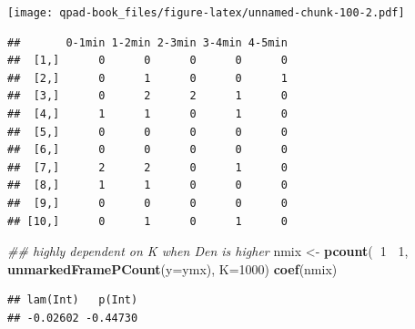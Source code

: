 \documentclass[12pt,]{book}
\newenvironment{Shaded}{\begin{snugshade}}{\end{snugshade}}
\newcommand{\CommentTok}[1]{\textcolor[rgb]{0.56,0.35,0.01}{\textit{#1}}}
\newcommand{\ControlFlowTok}[1]{\textcolor[rgb]{0.13,0.29,0.53}{\textbf{#1}}}
\newcommand{\DataTypeTok}[1]{\textcolor[rgb]{0.13,0.29,0.53}{#1}}
\newcommand{\DecValTok}[1]{\textcolor[rgb]{0.00,0.00,0.81}{#1}}
\newcommand{\FloatTok}[1]{\textcolor[rgb]{0.00,0.00,0.81}{#1}}
\newcommand{\KeywordTok}[1]{\textcolor[rgb]{0.13,0.29,0.53}{\textbf{#1}}}
\newcommand{\NormalTok}[1]{#1}
\newcommand{\OperatorTok}[1]{\textcolor[rgb]{0.81,0.36,0.00}{\textbf{#1}}}
\newcommand{\StringTok}[1]{\textcolor[rgb]{0.31,0.60,0.02}{#1}}
\begin{document}
\texttt{[image: qpad-book\_files/figure-latex/unnamed-chunk-100-2.pdf]}

\begin{Shaded}
\end{Shaded}

\begin{verbatim}
##       0-1min 1-2min 2-3min 3-4min 4-5min
##  [1,]      0      0      0      0      0
##  [2,]      0      1      0      0      1
##  [3,]      0      2      2      1      0
##  [4,]      1      1      0      1      0
##  [5,]      0      0      0      0      0
##  [6,]      0      0      0      0      0
##  [7,]      2      2      0      1      0
##  [8,]      1      1      0      0      0
##  [9,]      0      0      0      0      0
## [10,]      0      1      0      1      0
\end{verbatim}

\begin{Shaded}
\begin{Highlighting}[]
\CommentTok{## highly dependent on K when Den is higher}
\NormalTok{nmix <-}\StringTok{ }\KeywordTok{pcount}\NormalTok{(}\OperatorTok{~}\DecValTok{1} \OperatorTok{~}\DecValTok{1}\NormalTok{, }\KeywordTok{unmarkedFramePCount}\NormalTok{(}\DataTypeTok{y=}\NormalTok{ymx), }\DataTypeTok{K=}\DecValTok{1000}\NormalTok{)}
\KeywordTok{coef}\NormalTok{(nmix)}
\end{Highlighting}
\end{Shaded}

\begin{verbatim}
## lam(Int)   p(Int) 
## -0.02602 -0.44730
\end{verbatim}
\end{document}
